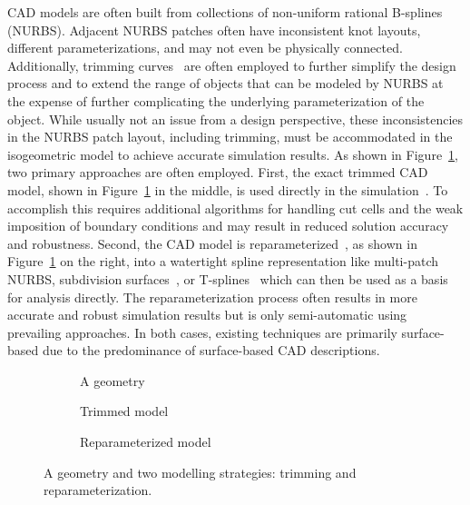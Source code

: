 CAD models are often built from collections of non-uniform rational B-splines (NURBS). Adjacent NURBS patches often have inconsistent knot layouts, different parameterizations, and may not even be physically connected. Additionally, trimming curves~\cite{kim2009isogeometric, schmidt2012isogeometric} are often employed to further simplify the design process and to extend the range of objects that can be modeled by NURBS at the expense of further complicating the underlying parameterization of the object. While usually not an issue from a design perspective, these inconsistencies in the NURBS patch layout, including trimming, must be accommodated in the isogeometric model to achieve accurate simulation results. As shown in Figure~\ref{fig:geometries}, two primary approaches are often employed. First, the exact trimmed CAD model, shown in Figure~\ref{fig:geometries} in the middle, is used directly in the simulation~\cite{schmidt2012isogeometric}. To accomplish this requires additional algorithms for handling cut cells and the weak imposition of boundary conditions and may result in reduced solution accuracy and robustness. Second, the CAD model is reparameterized~\cite{xu2014high}, as shown in Figure~\ref{fig:geometries} on the right, into a watertight spline representation like multi-patch NURBS, subdivision surfaces~\cite{peters2008subdivision}, or T-splines~\cite{sederberg_t-splines_2003} which can then be used as a basis for analysis directly. The reparameterization process often results in more accurate and robust simulation results but is only semi-automatic using prevailing approaches. In both cases, existing techniques are primarily surface-based due to the predominance of surface-based CAD descriptions.

\begin{figure}[ht]
	\captionsetup[subfigure]{labelformat=empty, font = footnotesize}
	\centering
	\begin{subfigure}[b]{0.32\textwidth}
		\centering
		
		\caption{A geometry}
	\end{subfigure}
	\begin{subfigure}[b]{0.32\textwidth}
		\centering
		
		\caption{Trimmed model}
	\end{subfigure}
	\begin{subfigure}[b]{0.32\textwidth}
		\centering
		
		\caption{Reparameterized model}
	\end{subfigure}
	\caption{A geometry and two modelling strategies: trimming and reparameterization.}
	\label{fig:geometries}
\end{figure}


